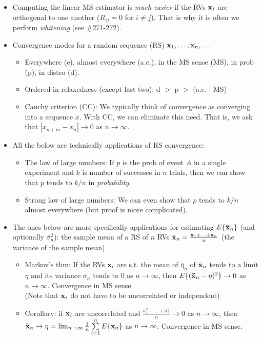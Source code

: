 \documentclass[a4paper]{book}
\begin{document}
\begin{itemize}
\item Computing the linear MS estimator is \textit{much easier} if the RVs $\mathbf{x}_i$ are orthogonal to one another (\ie $R_{ij}=0$ for $i\neq j$).  That is why it is often we perform \textit{whitening} (see \#271-272).
\item Convergence modes for a random sequence (RS) $\mathbf{x}_1, \hdots, \mathbf{x}_n, \hdots$
\begin{itemize}
\item Everywhere (e), almost everywhere (a.e.), in the MS sense (MS), in prob (p), in distro (d).
\item Ordered in relaxedness (except last two): d $>$ p $>$ (a.e. $|$ MS)
\item Cauchy criterion (CC): We typically think of convergence as converging into a sequence $x$. With CC, we can eliminate this need. That is, we ask that $|x_{n+m}-x_n|\to	0$ as $n\to	\infty$.
\end{itemize}
\item All the below are technically applications of RS convergence:
	\begin{itemize}
	\item The law of large numbers: If $p$ is the prob of event $A$ in a single experiment and $k$ is number of successes in $n$ trials, then we can show that $p$ tends to $k/n$ in \textit{probability}.
	\item Strong law of large numbers: We can even show that $p$ tends to $k/n$ almost everywhere (but proof is more complicated).
	\end{itemize}
	\item The ones below are more specifically applications for estimating $E\{\mathbf{\bar{x}}_n\}$ (and optionally $\bar{\sigma}^2_n$): the sample mean of a RS of $n$ RVs $\mathbf{\bar{x}}_n=\frac{\mathbf{x}_1+\hdots+\mathbf{x}_n}{n}$ (the variance of the sample mean)
	\begin{itemize}
	\item Markov's thm: If the RVs $\mathbf{x}_i$ are s.t. the mean of $\bar{\eta}_n$ of $\bar{\mathbf{x}}_n$ tends to a limit $\eta$ and its variance $\bar{\sigma}_n$ tends to $0$ as $n\to \infty$, then $E\{(\mathbf{\bar{x}}_n-\eta)^2\}\to 0$ as $n\to \infty$. Convergence in MS sense.\\
	(Note that $\mathbf{x}_i$ do not have to be uncorrelated or independent)
	\item Corollary: if $\mathbf{x}_i$ are uncorrelated and $\frac{\sigma_1^2+\hdots+\sigma_n^2}{n}\to 0$ as $n\to \infty$, then $\mathbf{\bar{x}}_n\to \eta=\lim_{n\to\infty} \frac{1}{n}\sum\limits_{i=1}^n E\{\mathbf{x}_n\}$ as $n\to \infty$. Convergence in MS sense. \\

\end{itemize}
\end{itemize}
\end{document}
